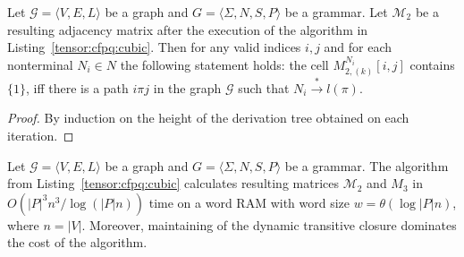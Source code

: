 \begin{theorem}
    Let $\mathcal{G} =  \langle V,E,L\rangle$ be a graph and $G = \langle\Sigma, N, S, P\rangle$ be a grammar.
    Let $\mathcal{M}_{2}$ be a resulting adjacency matrix after the execution of the algorithm in Listing~\ref{tensor:cfpq:cubic}. Then for any valid indices $i, j$ and for each nonterminal $N_i \in N$ the following statement holds: the cell $M_{2,(k)}^{N_i}[i,j]$ contains $\{1\}$, iff there is a path $i\pi j$ in the graph $\mathcal{G}$ such that $ N_i \xrightarrow{*} l(\pi)$.
\end{theorem}{}
\begin{proof}
    By induction on the height of the derivation tree obtained on each iteration.
\end{proof}{}

\begin{theorem}{}
\label{theorem: subcubic}
    Let $\mathcal{G} = \langle V,E,L \rangle$ be a graph and $G = \langle\Sigma, N, S, P\rangle$ be a grammar.
    The algorithm from Listing~\ref{tensor:cfpq:cubic} calculates resulting matrices $\mathcal{M}_2$ and $M_3$ in $O({|P|}^3n^3/\log (|P|n))$ time on a word RAM with word size $w= \theta(\log |P|n)$, where $n = |V|$. Moreover, maintaining of the dynamic transitive closure dominates the cost of the algorithm.
\end{theorem}

